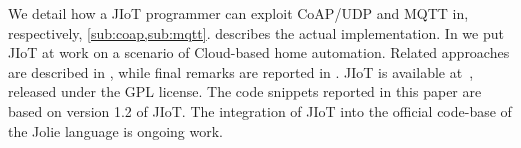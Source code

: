 We detail how a JIoT programmer can exploit CoAP/UDP and MQTT in, respectively,
\cref{sub:coap,sub:mqtt}.  describes the
actual implementation. In  we put JIoT at work on a
scenario of Cloud-based home automation. Related approaches are described in , while final remarks are reported in .
%
JIoT is available at~\cite{jiot}, released under the GPL license. The code
snippets reported in this paper are based on version 1.2 of JIoT. The
integration of JIoT into the official code-base of the Jolie language is
ongoing work.
